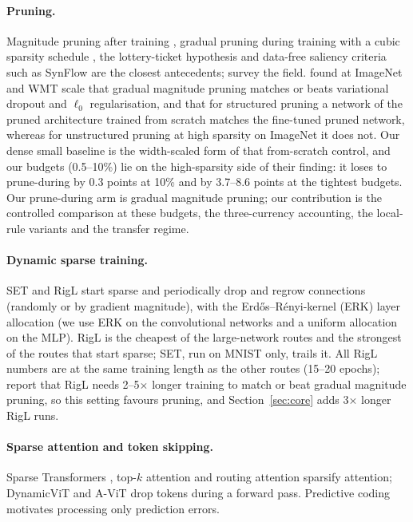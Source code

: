 \documentclass[11pt]{article}
\begin{document}
\paragraph{Pruning.} Magnitude pruning after training \citep{han2015}, gradual pruning during training with a cubic sparsity
schedule \citep{zhu2017}, the lottery-ticket hypothesis \citep{frankle2019} and data-free saliency criteria such as SynFlow
\citep{tanaka2020} are the closest antecedents; \citet{hoefler2021} survey the field. \citet{gale2019} found at ImageNet and
WMT scale that gradual magnitude pruning matches or beats variational dropout and $\ell_0$ regularisation, and
\citet{liu2019} that for structured pruning a network of the pruned architecture trained from scratch matches the fine-tuned
pruned network, whereas for unstructured pruning at high sparsity on ImageNet it does not. Our dense small baseline is the
width-scaled form of that from-scratch control, and our budgets (0.5--10\%) lie on the high-sparsity side of their finding:
it loses to prune-during by 0.3 points at 10\% and by 3.7--8.6 points at the tightest budgets. Our prune-during arm is gradual
magnitude pruning; our contribution is the controlled comparison at these budgets, the three-currency accounting, the
local-rule variants and the transfer regime.

\paragraph{Dynamic sparse training.} SET \citep{mocanu2018} and RigL \citep{evci2020} start sparse and periodically drop and
regrow connections (randomly or by gradient magnitude), with the Erd\H{o}s--R\'enyi-kernel (ERK) layer allocation (we use
ERK on the convolutional networks and a uniform allocation on the MLP). RigL is the cheapest of the large-network routes
and the strongest of the routes that start sparse; SET, run on MNIST only, trails
it. All RigL numbers are at the same training length as the other routes (15--20 epochs); \citet{evci2020} report that RigL
needs 2--5$\times$ longer training to match or beat gradual magnitude pruning, so this setting favours pruning, and
Section~\ref{sec:core} adds 3$\times$ longer RigL runs.

\paragraph{Sparse attention and token skipping.} Sparse Transformers \citep{child2019}, top-$k$ attention \citep{gupta2021}
and routing attention \citep{roy2021} sparsify attention; DynamicViT \citep{rao2021} and A-ViT \citep{yin2022} drop tokens
during a forward pass. Predictive coding \citep{friston2010,millidge2022} motivates processing only prediction errors.
\end{document}
